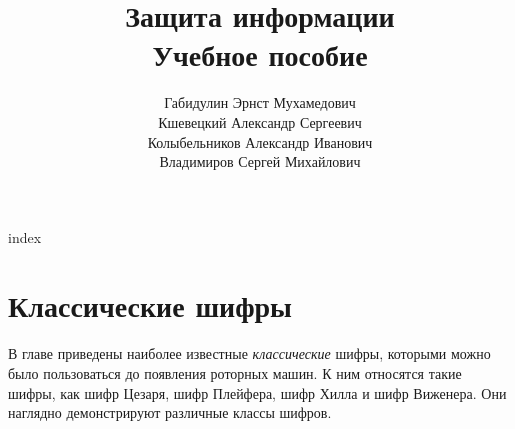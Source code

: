 



\title{Защита информации \\ Учебное пособие}
\author{Габидулин Эрнст Мухамедович \\ Кшевецкий Александр Сергеевич \\ Колыбельников Александр Иванович \\ Владимиров Сергей Михайлович}
\date{
}
\maketitle
\setcounter{page}{3}

\newpage
\setcounter{tocdepth}{2}
\tableofcontents
\newpage




{index}



\chapter{Классические шифры}

В главе приведены наиболее известные \emph{классические} шифры, которыми можно было пользоваться до появления роторных машин. К ним относятся такие шифры, как шифр Цезаря, шифр Плейфера, шифр Хилла и шифр Виженера. Они наглядно демонстрируют различные классы шифров.







%

